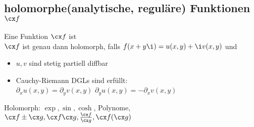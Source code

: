 \documentclass[fs, footer]{latex4ei}
\begin{document}
\begin{sectionbox}
\begin{sectionbox}
\begin{sectionbox}
	\subsection{holomorphe(analytische, reguläre) Funktionen $\cx f$}
	Eine Funktion $\cx f$ ist \\ 
	$\cx f$ ist genau dann holomorph, falls $f(x+y\i) = u(x,y) + \i v(x,y)$ und
	\begin{itemize}\itemsep0pt
		\item $u,v$ sind stetig partiell diffbar
		\item Cauchy-Riemann DGLs sind erfüllt:\\
		$\partial_x u(x,y) = \partial_y v(x,y)$ \qquad $\partial_y u(x,y) = - \partial_x v(x,y)$\\
	\end{itemize}
	Holomorph: $\exp, \sin, \cosh$, Polynome, $\cx f\pm \cx g, \cx f \cx g, \frac{\cx f}{\cx g}, \cx f(\cx g)$
\end{sectionbox}

\begin{sectionbox}

\end{sectionbox}
\end{sectionbox}
\end{sectionbox}
\end{document}
